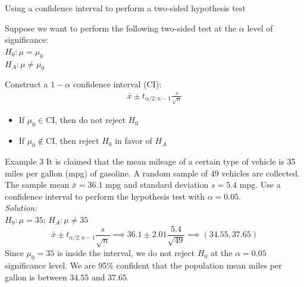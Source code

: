 \documentclass[fleqn, 10pt]{beamer}\usepackage[]{graphicx}\usepackage[]{color}
\begin{document}
\begin{frame}{Using a confidence interval to perform a two-sided hypothesis test}

Suppose we want to perform the following two-sided test at the $\alpha$ level of significance:\\
\vspace{5pt}
$H_0: \mu = \mu_0$\\
$H_A: \mu \neq \mu_0$\\
\vspace{11pt}

Construct a $1-\alpha$ confidence interval (CI): 
\begin{align*}
\bar{x} \pm t_{\alpha/2; n-1} \frac{s}{\sqrt{n}}
\end{align*}
\begin{itemize}
\item If $\mu_0 \in \text{CI}$, then do not reject $H_0$
\item If $\mu_0 \not\in \text{CI}$, then reject $H_0$ in favor of $H_A$
\end{itemize}
\end{frame}

\begin{frame}{Example 3}
It is claimed that the mean mileage of a certain type of vehicle is 35 miles per gallon (mpg) of gasoline.  A random sample of 49 vehicles are collected. The sample mean $\bar{x}=36.1$ mpg and standard deviation $s=5.4$ mpg.  Use a confidence interval to perform the hypothesis test with $\alpha=0.05$.\\

\bigskip
\emph{Solution:}\\
$H_0: \mu = 35$; $H_A: \mu \neq 35$
$$\bar{x} \pm t_{\alpha / 2; n-1} \frac{s}{\sqrt{n}} \implies
36.1 \pm 2.01 \frac{5.4}{\sqrt{49}}
\implies (34.55, 37.65)$$
Since $\mu_0 = 35$ is inside the interval, we do not reject $H_0$ at the $\alpha = 0.05$ significance level.  We are 95\% confident that the population mean miles per gallon is between 34.55 and 37.65.
\end{frame}
\end{document}
